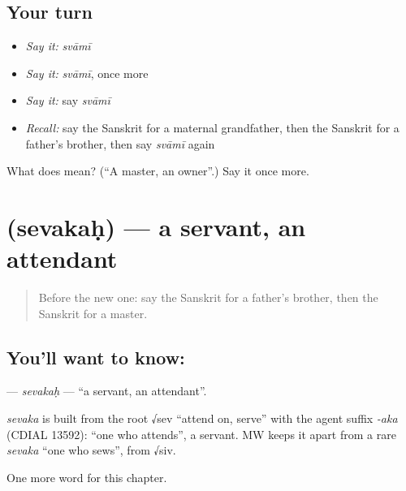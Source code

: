 \subsection*{Your turn}
\begin{itemize}
\raggedright
  \item \emph{Say it:} \emph{svāmī}
  \item \emph{Say it:} \emph{svāmī}, once more
  \item \emph{Say it:} say \emph{svāmī}
  \item \emph{Recall:} say the Sanskrit for a maternal grandfather, then the Sanskrit for a father's brother, then say \emph{svāmī} again
\end{itemize}

\begin{tcolorbox}[breakable,colback=teal!4,colframe=teal!35!black,title={Before you move on}]
What does  mean? (\textquotedblleft{}A master, an owner\textquotedblright{}.) Say it once more.
\end{tcolorbox}
\section[\texorpdfstring{\sk{सेवकः} (sevakaḥ)}{सेवकः (sevakaḥ)}]{ (sevakaḥ) — a servant, an attendant}

\label{lesson:SA-C147-sevakah}



\begin{quote}
Before the new one: say the Sanskrit for a father's brother, then the Sanskrit for a master.
\end{quote}

\subsection*{You'll want to know: }
\textbf{} — \emph{sevakaḥ} — \textquotedblleft{}a servant, an attendant\textquotedblright{}.

\begin{cousinweb}
\emph{sevaka} is built from the root √sev \textquotedblleft{}attend on, serve\textquotedblright{} with the agent suffix \emph{-aka} (CDIAL 13592): \textquotedblleft{}one who attends\textquotedblright{}, a servant. MW keeps it apart from a rare \emph{sevaka} \textquotedblleft{}one who sews\textquotedblright{}, from √siv.
\end{cousinweb}

\begin{grammarlens}[title={What you've built}]
One more word for this chapter.
\end{grammarlens}

